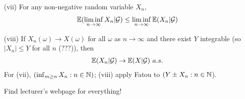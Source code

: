 \documentclass[a4paper]{article}
\begin{document}
(vii) For any non-negative random variable $X_n$,
\begin{equation*}
    \begin{aligned}
        \mathbb{E}(\liminf_{n \to \infty} X_n | \mathcal{G}) \leq \liminf_{n \to \infty} \mathbb{E}(X_n|\mathcal{G})
    \end{aligned}
\end{equation*}

(viii) If $X_n(\omega) \to X(\omega)$ for all $\omega$ as $n \to \infty$ and there exist $Y$ integrable (so $|X_n| \leq Y$ for all $n$ (???)), then
\begin{equation*}
    \begin{aligned}
        \mathbb{E}(X_n|\mathcal{G}) \to \mathbb{E}(X|\mathcal{G}) \ a.s.
    \end{aligned}
\end{equation*}
For (vii), $(\inf_{m\geq n} X_n : n \in \mathbb{N})$; (viii) apply Fatou to $(Y \pm X_n: n \in \mathbb{N}$).

Find lecturer's webpage for everything!
\end{document}
